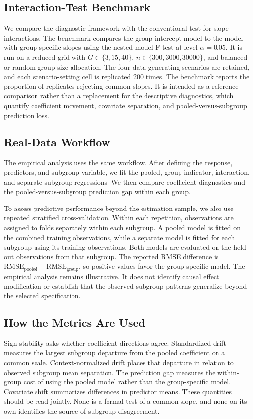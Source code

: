 \subsection{Interaction-Test Benchmark}

We compare the diagnostic framework with the conventional test for slope interactions. The benchmark compares the group-intercept model to the model with group-specific slopes using the nested-model F-test at level $\alpha=0.05$. It is run on a reduced grid with $G \in \{3,15,40\}$, $n \in \{300,3000,30000\}$, and balanced or random group-size allocation. The four data-generating scenarios are retained, and each scenario-setting cell is replicated 200 times. The benchmark reports the proportion of replicates rejecting common slopes. It is intended as a reference comparison rather than a replacement for the descriptive diagnostics, which quantify coefficient movement, covariate separation, and pooled-versus-subgroup prediction loss.

\subsection{Real-Data Workflow}

The empirical analysis uses the same workflow. After defining the response, predictors, and subgroup variable, we fit the pooled, group-indicator, interaction, and separate subgroup regressions. We then compare coefficient diagnostics and the pooled-versus-subgroup prediction gap within each group.

To assess predictive performance beyond the estimation sample, we also use repeated stratified cross-validation. Within each repetition, observations are assigned to folds separately within each subgroup. A pooled model is fitted on the combined training observations, while a separate model is fitted for each subgroup using its training observations. Both models are evaluated on the held-out observations from that subgroup. The reported RMSE difference is $\mathrm{RMSE}_{\mathrm{pooled}} - \mathrm{RMSE}_{\mathrm{group}}$, so positive values favor the group-specific model. The empirical analysis remains illustrative. It does not identify causal effect modification or establish that the observed subgroup patterns generalize beyond the selected specification.

\subsection{How the Metrics Are Used}

Sign stability asks whether coefficient directions agree. Standardized drift measures the largest subgroup departure from the pooled coefficient on a common scale. Context-normalized drift places that departure in relation to observed subgroup mean separation. The prediction gap measures the within-group cost of using the pooled model rather than the group-specific model. Covariate shift summarizes differences in predictor means. These quantities should be read jointly. None is a formal test of a common slope, and none on its own identifies the source of subgroup disagreement.